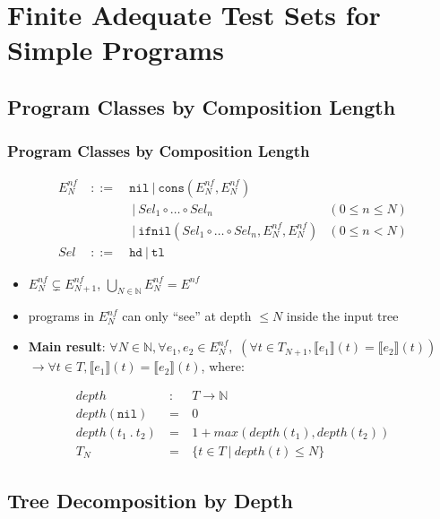 \documentclass{beamer}
\begin{document}
\section{Finite Adequate Test Sets for Simple Programs}

\subsection{Program Classes by Composition Length}

\begin{frame}
  \frametitle{Program Classes by Composition Length}
  \[\begin{array}{lclr}
  E^{nf}_N & ~::=~ & \texttt{nil} ~|~ \texttt{cons}(E^{nf}_N, E^{nf}_N) & \\
         &       & ~|~ \mathit{Sel}_1 \circ \ldots \circ \mathit{Sel}_n & (0 \le n \le N) \\
         &       & ~|~ \texttt{ifnil}(\mathit{Sel}_1 \circ \ldots \circ \mathit{Sel}_n, E^{nf}_N, E^{nf}_N) & (0 \le n < N) \\
  \mathit{Sel} & ~::=~ & \texttt{hd} ~|~ \texttt{tl} & 
  \end{array}
  \]
  \pause
  \begin{itemize}
    \item $E^{nf}_N \varsubsetneq E^{nf}_{N+1}$, $\bigcup_{N \in \mathbb{N}} E^{nf}_N = E^{nf}$
  \pause
    \item programs in $E^{nf}_N$ can only ``see'' at depth $\le N$ inside the input tree  
  \pause
    \item \textbf{Main result}:
    $\forall N \in \mathbb{N}, \forall e_1, e_2 \in E^{nf}_N,$ 
    $(\forall t \in T_{N+1}, \llbracket e_1 \rrbracket (t) = \llbracket e_2 \rrbracket (t))$
    $\rightarrow \forall t \in T, \llbracket e_1 \rrbracket (t) = \llbracket e_2 \rrbracket (t)$, where:
  \end{itemize}
    \[\begin{array}{lcl}
    \mathit{depth} & ~:~ & T \rightarrow \mathbb{N} \\
    \mathit{depth}(\texttt{nil}) & ~=~ & 0 \\
    \mathit{depth}(t_1 ~.~ t_2) & ~=~ & 1 + \mathit{max}(\mathit{depth}(t_1), \mathit{depth}(t_2)) \\
    T_{N} & ~=~ & \{t \in T ~|~ \mathit{depth}(t) \le N \} 
    \end{array}
    \]
\end{frame}

\subsection{Tree Decomposition by Depth}
\end{document}
